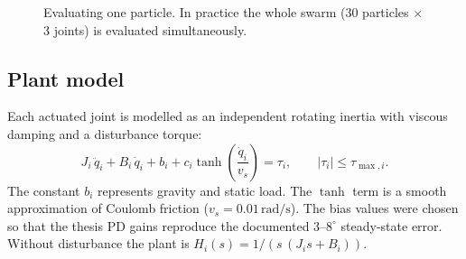 \documentclass[11pt,a4paper]{article}
\begin{document}
\begin{figure}[H]
\centering
{}
\caption{Evaluating one particle. In practice the whole swarm ($30$ particles $\times$ $3$ joints) is
evaluated simultaneously.}
\label{fig:evaluate}
\end{figure}

\subsection{Plant model}

Each actuated joint is modelled as an independent rotating inertia with viscous damping and a disturbance
torque:
\begin{equation}
J_i\,\ddot q_i + B_i\,\dot q_i + b_i + c_i\tanh\!\left(\frac{\dot q_i}{v_s}\right) = \tau_i,
\qquad |\tau_i| \le \tau_{\max,i}.
\label{eq:plant}
\end{equation}
The constant $b_i$ represents gravity and static load. The $\tanh$ term is a smooth approximation of
Coulomb friction ($v_s = 0.01\,\mathrm{rad/s}$). The bias values were chosen so that the thesis PD gains
reproduce the documented $3$--$8^\circ$ steady-state error. Without disturbance the plant is
$H_i(s) = 1/\left(s\,(J_i s + B_i)\right)$.
\end{document}
